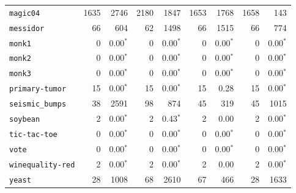 \begin{tabular}{lrrrrrrrr}
\texttt{magic04} & 1635 & 2746 & 2180 & 1847 & 1653 & 1768 & 1658 & 143\\
\texttt{messidor} & 66 & 604 & 62 & 1498 & 66 & 1515 & 66 & 774\\
\texttt{monk1} & 0 & 0.00$^*$ & 0 & 0.00$^*$ & 0 & 0.00$^*$ & 0 & 0.00$^*$\\
\texttt{monk2} & 0 & 0.00$^*$ & 0 & 0.00$^*$ & 0 & 0.00$^*$ & 0 & 0.00$^*$\\
\texttt{monk3} & 0 & 0.00$^*$ & 0 & 0.00$^*$ & 0 & 0.00$^*$ & 0 & 0.00$^*$\\
\texttt{primary-tumor} & 15 & 0.00$^*$ & 15 & 0.00$^*$ & 15 & 0.28 & 15 & 0.00$^*$\\
\texttt{seismic\_bumps} & 38 & 2591 & 98 & 874 & 45 & 319 & 45 & 1015\\
\texttt{soybean} & 2 & 0.00$^*$ & 2 & 0.43$^*$ & 2 & 0.00 & 2 & 0.00$^*$\\
\texttt{tic-tac-toe} & 0 & 0.00$^*$ & 0 & 0.00$^*$ & 0 & 0.00$^*$ & 0 & 0.00$^*$\\
\texttt{vote} & 0 & 0.00$^*$ & 0 & 0.00$^*$ & 0 & 0.00$^*$ & 0 & 0.00$^*$\\
\texttt{winequality-red} & 2 & 0.00$^*$ & 2 & 0.00$^*$ & 2 & 0.00 & 2 & 0.00$^*$\\
\texttt{yeast} & 28 & 1008 & 68 & 2610 & 67 & 466 & 28 & 1633\\
\bottomrule
\end{tabular}
